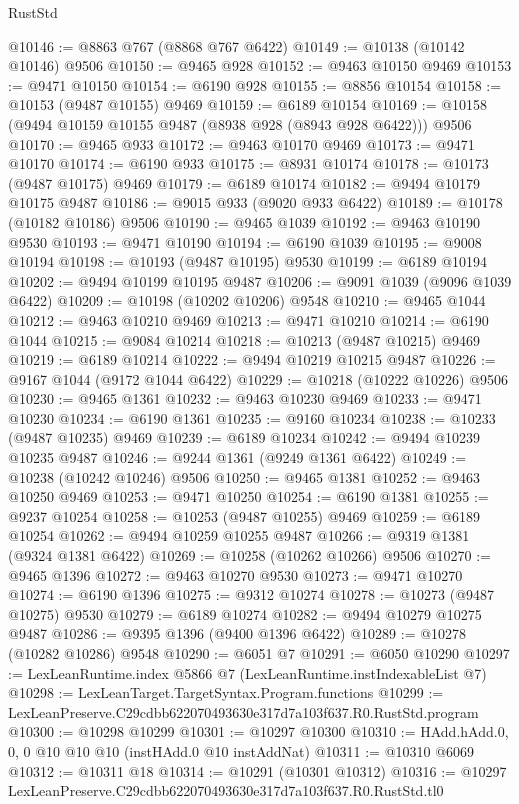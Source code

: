 \begin{lexlean}{RustStd}
\begin{coremodule}
@10146 := @8863 @767 (@8868 @767 @6422)
@10149 := @10138 (@10142 @10146) @9506
@10150 := @9465 @928
@10152 := @9463 @10150 @9469
@10153 := @9471 @10150
@10154 := @6190 @928
@10155 := @8856 @10154
@10158 := @10153 (@9487 @10155) @9469
@10159 := @6189 @10154
@10169 := @10158 (@9494 @10159 @10155 @9487 (@8938 @928 (@8943 @928 @6422))) @9506
@10170 := @9465 @933
@10172 := @9463 @10170 @9469
@10173 := @9471 @10170
@10174 := @6190 @933
@10175 := @8931 @10174
@10178 := @10173 (@9487 @10175) @9469
@10179 := @6189 @10174
@10182 := @9494 @10179 @10175 @9487
@10186 := @9015 @933 (@9020 @933 @6422)
@10189 := @10178 (@10182 @10186) @9506
@10190 := @9465 @1039
@10192 := @9463 @10190 @9530
@10193 := @9471 @10190
@10194 := @6190 @1039
@10195 := @9008 @10194
@10198 := @10193 (@9487 @10195) @9530
@10199 := @6189 @10194
@10202 := @9494 @10199 @10195 @9487
@10206 := @9091 @1039 (@9096 @1039 @6422)
@10209 := @10198 (@10202 @10206) @9548
@10210 := @9465 @1044
@10212 := @9463 @10210 @9469
@10213 := @9471 @10210
@10214 := @6190 @1044
@10215 := @9084 @10214
@10218 := @10213 (@9487 @10215) @9469
@10219 := @6189 @10214
@10222 := @9494 @10219 @10215 @9487
@10226 := @9167 @1044 (@9172 @1044 @6422)
@10229 := @10218 (@10222 @10226) @9506
@10230 := @9465 @1361
@10232 := @9463 @10230 @9469
@10233 := @9471 @10230
@10234 := @6190 @1361
@10235 := @9160 @10234
@10238 := @10233 (@9487 @10235) @9469
@10239 := @6189 @10234
@10242 := @9494 @10239 @10235 @9487
@10246 := @9244 @1361 (@9249 @1361 @6422)
@10249 := @10238 (@10242 @10246) @9506
@10250 := @9465 @1381
@10252 := @9463 @10250 @9469
@10253 := @9471 @10250
@10254 := @6190 @1381
@10255 := @9237 @10254
@10258 := @10253 (@9487 @10255) @9469
@10259 := @6189 @10254
@10262 := @9494 @10259 @10255 @9487
@10266 := @9319 @1381 (@9324 @1381 @6422)
@10269 := @10258 (@10262 @10266) @9506
@10270 := @9465 @1396
@10272 := @9463 @10270 @9530
@10273 := @9471 @10270
@10274 := @6190 @1396
@10275 := @9312 @10274
@10278 := @10273 (@9487 @10275) @9530
@10279 := @6189 @10274
@10282 := @9494 @10279 @10275 @9487
@10286 := @9395 @1396 (@9400 @1396 @6422)
@10289 := @10278 (@10282 @10286) @9548
@10290 := @6051 @7
@10291 := @6050 @10290
@10297 := LexLeanRuntime.index @5866 @7 (LexLeanRuntime.instIndexableList @7)
@10298 := LexLeanTarget.TargetSyntax.Program.functions
@10299 := LexLeanPreserve.C29cdbb622070493630e317d7a103f637.R0.RustStd.program
@10300 := @10298 @10299
@10301 := @10297 @10300
@10310 := HAdd.hAdd.{0, 0, 0} @10 @10 @10 (instHAdd.{0} @10 instAddNat)
@10311 := @10310 @6069
@10312 := @10311 @18
@10314 := @10291 (@10301 @10312)
@10316 := @10297 LexLeanPreserve.C29cdbb622070493630e317d7a103f637.R0.RustStd.tl0

\end{coremodule}
\end{lexlean}
